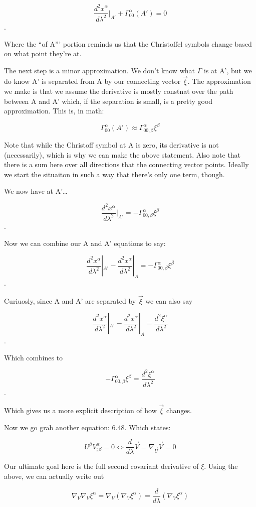 \documentclass[landscape,letterpaper,10pt,english]{article}
\begin{document}
\[ \frac{d^2 x^\alpha}{d\lambda^2}|_{A'} + \Gamma^\alpha_{00}(A') = 0 \].

Where the ``of A''' portion reminds us that the Christoffel symbols
change based on what point they're at.

    The next step is a minor approximation. We don't know what \(\Gamma\) is
at A', but we do know A' is separated from A by our connecting vector
\(\vec\xi\). The approximation we make is that we assume the derivative
is mostly constnat over the path between A and A' which, if the
separation is small, is a pretty good approximation. This is, in math:

\[\Gamma^\alpha_{00}(A') \approx \Gamma^\alpha_{00,\beta} \xi^\beta\]

Note that while the Christoff symbol at A is zero, its derivative is not
(necessarily), which is why we can make the above statement. Also note
that there is a sum here over all directions that the connecting vector
points. Ideally we start the situaiton in such a way that there's only
one term, though.

We now have at A'\ldots{}

\[ \frac{d^2 x^\alpha}{d\lambda^2}|_{A'}  = -\Gamma^\alpha_{00,\beta}\xi^\beta \].

    Now we can combine our A and A' equations to say:

\[ \frac{d^2 x^\alpha}{d\lambda^2}|_{A'} - \frac{d^2x^\alpha}{d\lambda^2} |_A  = -\Gamma^\alpha_{00,\beta}\xi^\beta \].

Curiuosly, since A and A' are separated by \(\vec\xi\) we can also say

\[ \frac{d^2 x^\alpha}{d\lambda^2}|_{A'} - \frac{d^2x^\alpha}{d\lambda^2} |_A  = \frac{d^2\xi^\alpha}{d\lambda^2} \].

Which combines to

\[ -\Gamma^\alpha_{00,\beta}\xi^\beta  = \frac{d^2\xi^\alpha}{d\lambda^2}\].

Which gives us a more explicit description of how \(\vec\xi\) changes.

    Now we go grab another equation: 6.48. Which states:

\[U^\beta V^\alpha_{;\beta} = 0 \Leftrightarrow \frac{d}{d\lambda} \vec{V} = \nabla_{\vec U}\vec V = 0\]

    Our ultimate goal here is the full second covariant derivative of
\(\xi\). Using the above, we can actually write out

\[ \nabla_V \nabla_V \xi^\alpha = \nabla_V (\nabla_V \xi^\alpha)  = \frac{d}{d\lambda}(\nabla_V \xi^\alpha) \]
\end{document}
